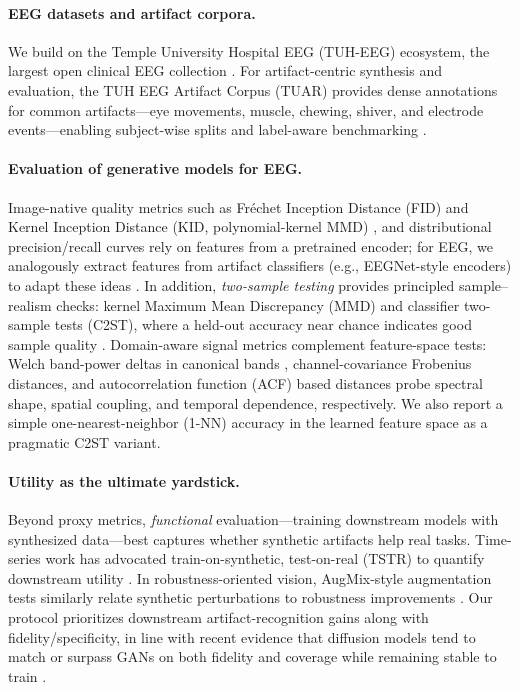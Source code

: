 \documentclass{article}
\begin{document}
\paragraph{EEG datasets and artifact corpora.}
We build on the Temple University Hospital EEG (TUH-EEG) ecosystem, the largest open clinical EEG collection \citep{obeid2016tuh}. For artifact-centric synthesis and evaluation, the TUH EEG Artifact Corpus (TUAR) provides dense annotations for common artifacts—eye movements, muscle, chewing, shiver, and electrode events—enabling subject-wise splits and label-aware benchmarking \citep{hamid2020tuar}. 

\paragraph{Evaluation of generative models for EEG.}
Image-native quality metrics such as Fréchet Inception Distance (FID) \citep{heusel2017ganstrained} and Kernel Inception Distance (KID, polynomial-kernel MMD) \citep{binkowski2018demystifyingmmd}, and distributional precision/recall curves \citep{sajjadi2018assessingprecision,kynkaanniemi2019improvedprecision} rely on features from a pretrained encoder; for EEG, we analogously extract features from artifact classifiers (e.g., EEGNet-style encoders) to adapt these ideas \citep{lawhern2018eegnetcompact}. In addition, \emph{two-sample testing} provides principled sample–realism checks: kernel Maximum Mean Discrepancy (MMD) \citep{gretton2012kerneltwo} and classifier two-sample tests (C2ST), where a held-out accuracy near chance indicates good sample quality \citep{lopezpaz2017revisitingclassifier}. Domain-aware signal metrics complement feature-space tests: Welch band-power deltas in canonical bands \citep{welch1967usefast}, channel-covariance Frobenius distances, and autocorrelation function (ACF) based distances probe spectral shape, spatial coupling, and temporal dependence, respectively. We also report a simple one-nearest-neighbor (1-NN) accuracy in the learned feature space as a pragmatic C2ST variant. 

\paragraph{Utility as the ultimate yardstick.}
Beyond proxy metrics, \emph{functional} evaluation—training downstream models with synthesized data—best captures whether synthetic artifacts help real tasks. Time-series work has advocated train-on-synthetic, test-on-real (TSTR) to quantify downstream utility \citep{yoon2019timegan}. In robustness-oriented vision, AugMix-style augmentation tests similarly relate synthetic perturbations to robustness improvements \citep{hendrycks2020augmixsimple}. Our protocol prioritizes downstream artifact-recognition gains along with fidelity/specificity, in line with recent evidence that diffusion models tend to match or surpass GANs on both fidelity and coverage while remaining stable to train \citep{dhariwal2021beatgans,nichol2021improveddenoising}.
\end{document}
